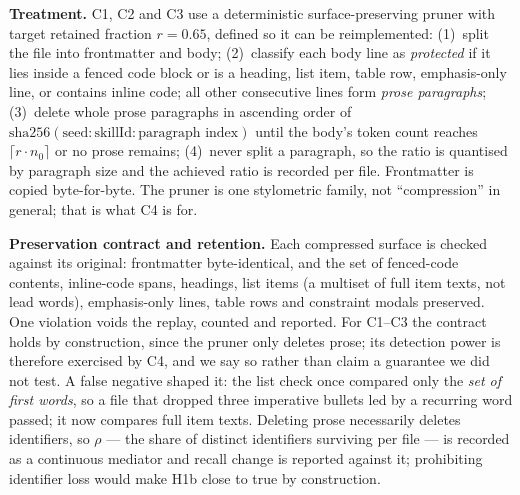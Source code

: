 \documentclass[10pt,conference]{IEEEtran}
\begin{document}
\textbf{Treatment.} C1, C2 and C3 use a deterministic surface-preserving pruner with target retained fraction $r=0.65$, defined so it can be reimplemented: (1)~split the file into frontmatter and body; (2)~classify each body line as \emph{protected} if it lies inside a fenced code block or is a heading, list item, table row, emphasis-only line, or contains inline code; all other consecutive lines form \emph{prose paragraphs}; (3)~delete whole prose paragraphs in ascending order of $\mathrm{sha256}(\text{seed}:\text{skillId}:\text{paragraph index})$ until the body's token count reaches $\lceil r\cdot n_0\rceil$ or no prose remains; (4)~never split a paragraph, so the ratio is quantised by paragraph size and the achieved ratio is recorded per file. Frontmatter is copied byte-for-byte. The pruner is one stylometric family, not ``compression'' in general; that is what C4 is for.

\textbf{Preservation contract and retention.} Each compressed surface is checked against its original: frontmatter byte-identical, and the set of fenced-code contents, inline-code spans, headings, list items (a multiset of full item texts, not lead words), emphasis-only lines, table rows and constraint modals preserved. One violation voids the replay, counted and reported. For C1--C3 the contract holds by construction, since the pruner only deletes prose; its detection power is therefore exercised by C4, and we say so rather than claim a guarantee we did not test. A false negative shaped it: the list check once compared only the \emph{set of first words}, so a file that dropped three imperative bullets led by a recurring word passed; it now compares full item texts. Deleting prose necessarily deletes identifiers, so $\rho$ --- the share of distinct identifiers surviving per file --- is recorded as a continuous mediator and recall change is reported against it; prohibiting identifier loss would make H1b close to true by construction.
\end{document}
